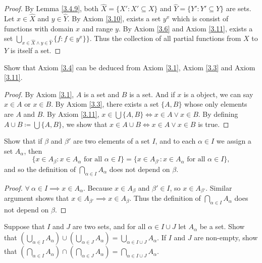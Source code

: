 \begin{proof}
By Lemma \ref{3.4.9}, both \(\hat{X} = \{X' : X' \subseteq X\}\) and \(\hat{Y} = \{Y' : Y' \subseteq Y\}\) are sets.
Let \(x \in \hat{X}\) and \(y \in \hat{Y}\).
By Axiom \ref{3.10}, exists a set \(y^{x}\) which is consist of functions with domain \(x\) and range \(y\).
By Axiom \ref{3.6} and Axiom \ref{3.11}, exists a set \(\bigcup_{x \in \hat{X} \land y \in \hat{Y}} \{f : f \in y^{x}\}\}\).
Thus the collection of all partial functions from \(X\) to \(Y\) is itself a set.
\end{proof}

\begin{exercise}\label{ex 3.4.8}
Show that Axiom \ref{3.4} can be deduced from Axiom \ref{3.1}, Axiom \ref{3.3} and Axiom \ref{3.11}.
\end{exercise}

\begin{proof}
By Axiom \ref{3.1}, \(A\) is a set and \(B\) is a set.
And if \(x\) is a object, we can say \(x \in A\) or \(x \in B\).
By Axiom \ref{3.3}, there exists a set \(\{A, B\}\) whose only elements are \(A\) and \(B\).
By Axiom \ref{3.11}, \(x \in \bigcup \{A, B\} \iff x \in A \lor x \in B\).
By defining \(A \cup B \coloneqq \bigcup \{A, B\}\), we show that \(x \in A \cup B \iff x \in A \lor x \in B\) is true.
\end{proof}

\begin{exercise}\label{ex 3.4.9}
Show that if \(\beta\) and \(\beta'\) are two elements of a set \(I\), and to each \(\alpha \in I\) we assign a set \(A_{\alpha}\), then
\[
    \{x \in A_{\beta} : x \in A_{\alpha} \text{ for all } \alpha \in I\} = \{x \in A_{\beta'} : x \in A_{\alpha} \text{ for all } \alpha \in I\},
\]
and so the definition of \(\bigcap_{\alpha \in I} A_{\alpha}\) does not depend on \(\beta\).
\end{exercise}

\begin{proof}
\(\forall\ \alpha \in I \implies x \in A_{\alpha}\).
Because \(x \in A_{\beta}\) and \(\beta' \in I\), so \(x \in A_{\beta'}\).
Similar argument shows that \(x \in A_{\beta'} \implies x \in A_{\beta}\).
Thus the definition of \(\bigcap_{\alpha \in I} A_{\alpha}\) does not depend on \(\beta\).
\end{proof}

\begin{exercise}\label{ex 3.4.10}
Suppose that \(I\) and \(J\) are two sets, and for all \(\alpha \in I \cup J\) let \(A_{\alpha}\) be a set.
Show that \((\bigcup_{\alpha \in I} A_{\alpha}) \cup (\bigcup_{\alpha \in J} A_{\alpha}) = \bigcup_{\alpha \in I \cup J} A_{\alpha}\).
If \(I\) and \(J\) are non-empty, show that \((\bigcap_{\alpha \in I} A_{\alpha}) \cap (\bigcap_{\alpha \in J} A_{\alpha}) = \bigcap_{\alpha \in I \cup J} A_{\alpha}\).
\end{exercise}

